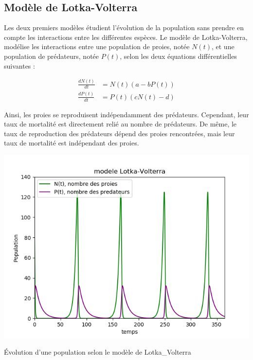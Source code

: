 \subsection{Modèle de Lotka-Volterra}
Les deux premiers modèles étudient l'évolution de la population sans prendre en compte les interactions entre les différentes espèces. Le modèle de Lotka-Volterra, modélise les interactions entre une population de proies, notée $N(t)$, et une population de prédateurs, notée $P(t)$, selon les deux équations différentielles suivantes :

\begin{align}
    \frac{dN(t)}{dt} &=  N(t) (a - bP(t)) \\
    \frac{dP(t)}{dt} &=  P(t) (cN(t) - d)
\end{align}

Ainsi, les proies se reproduisent indépendamment des prédateurs. Cependant, leur taux de mortalité est directement relié au nombre de prédateurs. De même, le taux de reproduction des prédateurs dépend des proies rencontrées, mais leur taux de mortalité est indépendant des proies. \\
\begin{minipage}[c]{.46\linewidth}
    \centering
    \includegraphics[width=\linewidth]{images/Lotka_Volterra.png}
    \captionsetup{type=figure}\caption{Évolution d'une population selon le modèle de Lotka\_Volterra}
    \label{fig:Lotka_Volterra}
\end{minipage}
